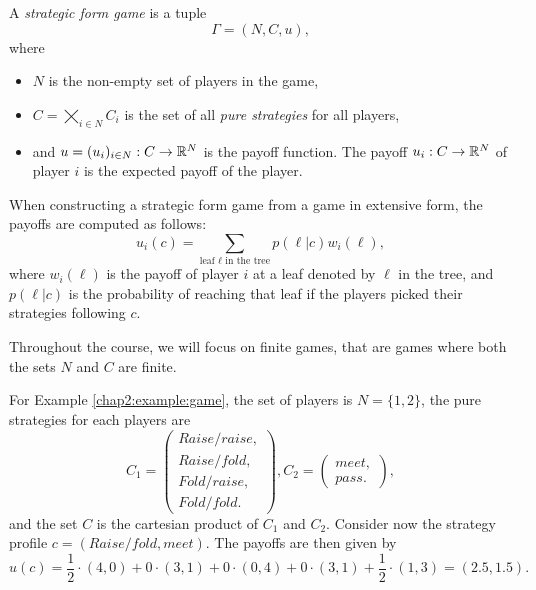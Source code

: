 \begin{definition}
A \emph{strategic form game} is a tuple
$$ \Gamma = (N, C, u),$$
where
\begin{itemize}
\item $N$ is the non-empty set of players in the game,
\item $C = \bigtimes_{i \in N}C_i$ is the set of all \emph{pure strategies} for all players,
\item and $u = (u_i)_{i \in N} : C \rightarrow \mathbb{R}^N$ is the payoff function.
The payoff $u_i : C \rightarrow \mathbb{R}^N$ of player $i$
is the expected payoff of the player.
\end{itemize}
When constructing a strategic form game from a game in extensive form, the payoffs are computed as follows:
$$u_i(c) = \sum_{\text{leaf $\ell$ in the tree}} p(\ell|c) w_i(\ell), $$
where $w_i(\ell)$ is the payoff of player $i$ at a leaf denoted by $\ell$ in the tree, and $p(\ell|c)$ is the probability of reaching that leaf if the players picked their strategies following $c$.
\end{definition}
Throughout the course, we will focus on finite games, that are games where both the sets $N$ and $C$ are finite.
\begin{example}
For Example \ref{chap2:example:game}, the set of players is $N = \{1,2\}$,
the pure strategies for each players are
 $$C_1 = \begin{pmatrix}
Raise/raise, \\
Raise/fold, \\
Fold/raise, \\
Fold/fold.
\end{pmatrix}, C_2 = \begin{pmatrix}
meet,\\
pass.
\end{pmatrix},$$
and the set $C$ is the cartesian product of $C_1$ and $C_2$.
Consider now the strategy profile $c = (Raise/fold, meet)$.
The payoffs are then given by
$$u(c) = \frac{1}{2} \cdot (4,0) + 0 \cdot (3,1)+ 0 \cdot (0,4) + 0 \cdot (3,1) + \frac{1}{2} \cdot (1,3) = (2.5,1.5).$$
\end{example}

